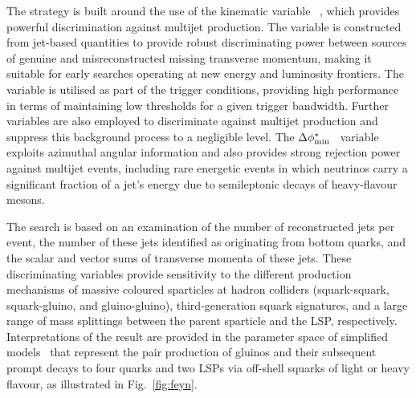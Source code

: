 The strategy is built around the use of the kinematic variable
\alphat~\cite{Randall:2008rw, RA1Paper}, which provides powerful
discrimination against multijet production. The \alphat variable is
constructed from jet-based quantities to provide robust discriminating
power between sources of genuine and misreconstructed missing
transverse momentum, making it suitable for early searches operating
at new energy and luminosity frontiers. The \alphat variable is
utilised as part of the trigger conditions, providing high performance
in terms of maintaining low thresholds for a given trigger
bandwidth. Further variables are also employed to discriminate against
multijet production and suppress this background process to a
negligible level. The $\Delta\phi^{*}_{\rm min}$~\cite{RA1Paper}
variable exploits azimuthal angular information and also provides
strong rejection power against multijet events, including rare
energetic events in which neutrinos carry a significant fraction of a
jet's energy due to semileptonic decays of heavy-flavour mesons.


The search is based on an examination of the number of reconstructed
jets per event, the number of these jets identified as originating
from bottom quarks, and the scalar and vector sums of transverse
momenta of these jets. 
These discriminating variables provide sensitivity to the different
production mechanisms of massive coloured sparticles at hadron
colliders (\ie squark-squark, squark-gluino, and gluino-gluino),
third-generation squark signatures, and a large range of mass
splittings between the parent sparticle and the LSP,
respectively. Interpretations of the result are provided in the
parameter space of simplified models~\cite{Alwall:2008ag,
  Alwall:2008va, sms} that represent the pair production of gluinos
and their subsequent prompt decays to four quarks and two LSPs via
off-shell squarks of light or heavy flavour, as illustrated in
Fig.~\ref{fig:feyn}.

